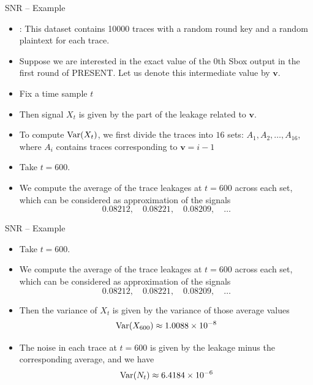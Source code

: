 \begin{frame}{SNR -- Example}
    \begin{example}
        \begin{itemize}
            \item \datarantwo: This dataset contains 10000 traces with a random round key and a random plaintext for each trace.
            \item Suppose we are interested in the exact value of the $0$th Sbox output in the first round of PRESENT. Let us denote this intermediate value by $\boldsymbol{v}$.
            \item Fix a time sample $t$
            \item Then signal $X_t$ is given by the part of the leakage related to $\boldsymbol{v}$.
            \item To compute $\textrm{Var}{\left(X_t\right)}$, we first divide the traces into $16$ sets: $A_1,A_2,\dots,A_{16}$, where $A_i$ contains traces corresponding to $\boldsymbol{v}=i-1$
            \item Take $t=600$.
            \item We compute the average of the trace leakages at $t=600$ across each set, which can be considered as approximation of the signals
            \[
0.08212,\quad0.08221,\quad0.08209,\quad\dots
\]
        \end{itemize}
    \end{example}
\end{frame}

\begin{frame}{SNR -- Example}
    \begin{example}
        \begin{itemize}
            \item Take $t=600$.
            \item We compute the average of the trace leakages at $t=600$ across each set, which can be considered as approximation of the signals
            \[
0.08212,\quad0.08221,\quad0.08209,\quad\dots
\]
\item Then the variance of $X_t$ is given by the variance of those average values
\[
\textrm{Var}{\left(X_{600}\right)}\approx1.0088\times10^{-8}
\]
\item The noise in each trace at $t=600$ is given by the leakage minus the corresponding average, and we have
\[
\textrm{Var}{\left(N_t\right)}\approx6.4184\times10^{-6}
\]
        \end{itemize}
    \end{example}
\end{frame}

